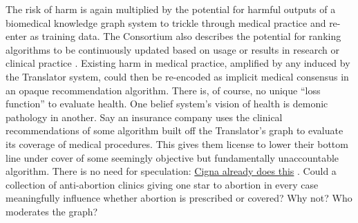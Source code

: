 The risk of harm is again multiplied by the potential for harmful
outputs of a biomedical knowledge graph system to trickle through
medical practice and re-enter as training data. The Consortium also
describes the potential for ranking algorithms to be continuously
updated based on usage or results in research or clinical
practice \cite{consortiumUniversalBiomedicalData2019} .
Existing harm in medical practice, amplified by any induced by the
Translator system, could then be re-encoded as implicit medical
consensus in an opaque recommendation algorithm. There is, of course, no
unique ``loss function'' to evaluate health. One belief system's vision
of health is demonic pathology in another. Say an insurance company uses
the clinical recommendations of some algorithm built off the
Translator's graph to evaluate its coverage of medical procedures. This
gives them license to lower their bottom line under cover of some
seemingly objective but fundamentally unaccountable algorithm. There is
no need for speculation:
\href{https://www.propublica.org/article/cigna-pxdx-medical-health-insurance-rejection-claims}{Cigna
already does this} \cite{ruckerHowCignaSaves2023} . Could a
collection of anti-abortion clinics giving one star to abortion in every
case meaningfully influence whether abortion is prescribed or covered?
Why not? Who moderates the graph?

